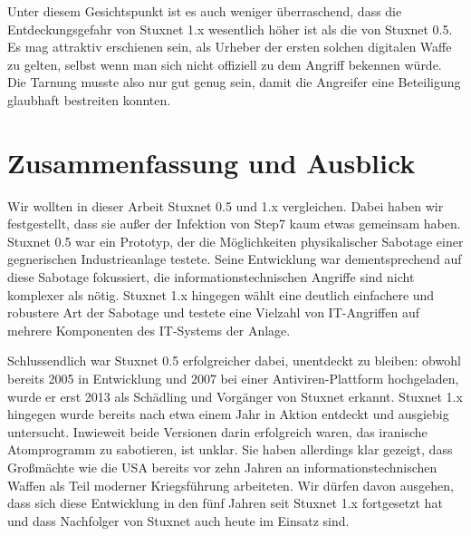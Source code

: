 \documentclass[a4paper]{article}
\begin{document}
Unter diesem Gesichtspunkt ist es auch weniger überraschend, dass die Entdeckungsgefahr von Stuxnet 1.x wesentlich höher ist als die von Stuxnet 0.5.
Es mag attraktiv erschienen sein, als Urheber der ersten solchen digitalen Waffe zu gelten,
selbst wenn man sich nicht offiziell zu dem Angriff bekennen würde.
Die Tarnung musste also nur gut genug sein, damit die Angreifer eine Beteiligung glaubhaft bestreiten konnten.

\section{Zusammenfassung und Ausblick}

Wir wollten in dieser Arbeit Stuxnet 0.5 und 1.x vergleichen.
Dabei haben wir festgestellt, dass sie außer der Infektion von Step7 kaum etwas gemeinsam haben.
Stuxnet 0.5 war ein Prototyp, der die Möglichkeiten physikalischer Sabotage einer gegnerischen Industrieanlage testete.
Seine Entwicklung war dementsprechend auf diese Sabotage fokussiert, die informationstechnischen Angriffe sind nicht komplexer als nötig.
Stuxnet 1.x hingegen wählt eine deutlich einfachere und robustere Art der Sabotage und testete eine Vielzahl von IT-Angriffen
auf mehrere Komponenten des IT-Systems der Anlage.

Schlussendlich war Stuxnet 0.5 erfolgreicher dabei, unentdeckt zu bleiben:
obwohl bereits 2005 in Entwicklung und 2007 bei einer Antiviren-Plattform hochgeladen,
wurde er erst 2013 als Schädling und Vorgänger von Stuxnet erkannt.
Stuxnet 1.x hingegen wurde bereits nach etwa einem Jahr in Aktion entdeckt und ausgiebig untersucht.
Inwieweit beide Versionen darin erfolgreich waren, das iranische Atomprogramm zu sabotieren, ist unklar.
Sie haben allerdings klar gezeigt, dass Großmächte wie die USA bereits vor zehn Jahren an informationstechnischen Waffen als Teil moderner Kriegsführung arbeiteten.
Wir dürfen davon ausgehen, dass sich diese Entwicklung in den fünf Jahren seit Stuxnet 1.x fortgesetzt hat
und dass Nachfolger von Stuxnet auch heute im Einsatz sind.



\end{document}
